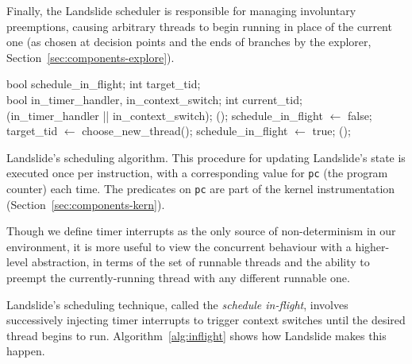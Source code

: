 Finally, the Landslide scheduler is responsible for managing involuntary preemptions, causing arbitrary threads to begin running in place of the current one (as chosen at decision points and the ends of branches by the explorer, Section~\ref{sec:components-explore}).

\begin{algorithm}[t]
	\footnotesize
	\begin{algorithmic}
		\State bool schedule\_in\_flight;
		\State int target\_tid;
		\\
		\State bool in\_timer\_handler, in\_context\_switch;
		\State int current\_tid;
		\\
				(in\_timer\_handler || in\_context\_switch);
						();
					\Else
						\State schedule\_in\_flight $\gets$ false;
					\EndIf
				\EndIf
				\State target\_tid $\gets$ {\sc choose\_new\_thread}();
				\State schedule\_in\_flight $\gets$ true;
				();
			\EndIf
		\EndFunction
	\end{algorithmic}
	\caption{Landslide's scheduling algorithm. This procedure for updating Landslide's state is executed once per instruction, with a corresponding value for \texttt{pc} (the program counter) each time. The predicates on \texttt{pc} are part of the kernel instrumentation (Section~\ref{sec:components-kern}).}
	\label{alg:inflight}
\end{algorithm}

Though we define timer interrupts as the only source of non-determinism in our environment, it is more useful to view the concurrent behaviour with a higher-level abstraction, in terms of the set of runnable threads and the ability to preempt the currently-running thread with any different runnable one.

Landslide's scheduling technique, called the {\em schedule in-flight}, involves successively injecting timer interrupts to trigger context switches until the desired thread begins to run. Algorithm~\ref{alg:inflight} shows how Landslide makes this happen.

